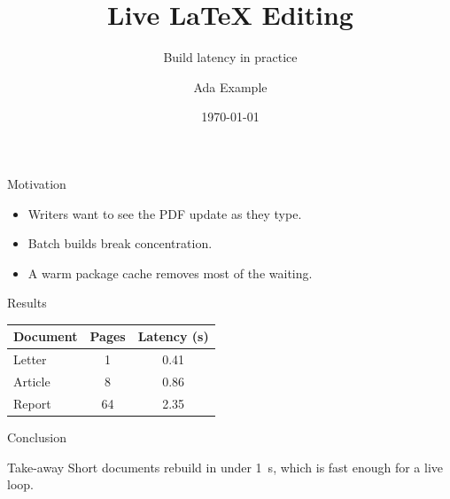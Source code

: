\documentclass[aspectratio=169]{beamer}
\title{Live \LaTeX{} Editing}
\subtitle{Build latency in practice}
\author{Ada Example}
\date{\today}
\begin{document}
\begin{frame}
  \titlepage
\end{frame}

\begin{frame}{Motivation}
  \begin{itemize}
    \item Writers want to see the PDF update as they type.
    \item Batch builds break concentration.
    \item A warm package cache removes most of the waiting.
  \end{itemize}
\end{frame}

\begin{frame}{Results}
  \centering
  \begin{tabular}{l S[table-format=3.0] S[table-format=1.2]}
    \toprule
    {Document} & {Pages} & {Latency (\si{\second})} \\
    \midrule
    Letter  &   1 & 0.41 \\
    Article &   8 & 0.86 \\
    Report  &  64 & 2.35 \\
    \bottomrule
  \end{tabular}
\end{frame}

\begin{frame}{Conclusion}
  \begin{block}{Take-away}
    Short documents rebuild in under \SI{1}{\second}, which is fast enough for a live loop.
  \end{block}
\end{frame}
\end{document}
